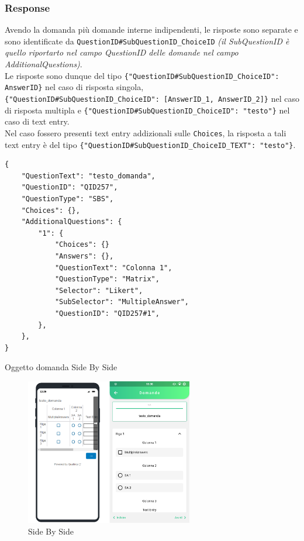 \subsubsection{Response}
Avendo la domanda più domande interne indipendenti, le risposte sono separate e sono identificate da \texttt{QuestionID\#SubQuestionID\_ChoiceID} \textit{(il SubQuestionID è quello riportarto nel campo QuestionID delle domande nel campo AdditionalQuestions)}. \\ Le risposte sono dunque del tipo \texttt{\{"QuestionID\#SubQuestionID\_ChoiceID": AnswerID\}} nel caso di risposta singola, \\ \texttt{\{"QuestionID\#SubQuestionID\_ChoiceID": [AnswerID\_1, AnswerID\_2]\}} nel caso di risposta multipla e \texttt{\{"QuestionID\#SubQuestionID\_ChoiceID": "testo"\}} nel caso di text entry. \\
Nel caso fossero presenti text entry addizionali sulle \texttt{Choices}, la risposta a tali text entry è del tipo \texttt{\{"QuestionID\#SubQuestionID\_ChoiceID\_TEXT": "testo"\}}.

\newpage
\begin{json}
\begin{verbatim}
{
    "QuestionText": "testo_domanda",
    "QuestionID": "QID257",
    "QuestionType": "SBS",
    "Choices": {},
    "AdditionalQuestions": {
        "1": {
            "Choices": {}
            "Answers": {},
            "QuestionText": "Colonna 1",
            "QuestionType": "Matrix",
            "Selector": "Likert",
            "SubSelector": "MultipleAnswer",
            "QuestionID": "QID257#1",
        },
    },
}
\end{verbatim}
\caption{Oggetto domanda Side By Side}
\label{json:sbs}
\end{json}

\begin{figure}[h!]
\centering
\includegraphics[width=0.65\textwidth]{img/sbs}
\caption{Side By Side}
\label{fig:sbs}
\end{figure}

